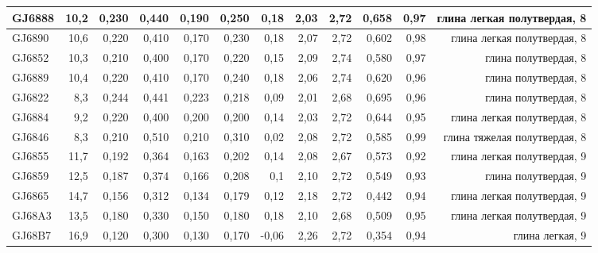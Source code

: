 \begin{landscape}
\begin{table}[h]
\begin{tabular}{@{}|l|r|r|r|r|r|r|r|r|r|r|r|@{}}
      GJ6888          & 10,2       & 0,230                        & 0,440   & 0,190  & 0,250  & 0,18     & 2,03     & 2,72      & 0,658   & 0,97     & глина легкая    полутвердая, 8   \\ \hline
      GJ6890          & 10,6       & 0,220                        & 0,410   & 0,170  & 0,230  & 0,18     & 2,07     & 2,72      & 0,602   & 0,98     & глина легкая    полутвердая, 8   \\ \hline
      GJ6852          & 10,3       & 0,210                        & 0,400   & 0,170  & 0,220  & 0,15     & 2,09     & 2,74      & 0,580   & 0,97     & глина полутвердая, 8   \\ \hline
      GJ6889          & 10,4       & 0,220                        & 0,410   & 0,170  & 0,240  & 0,18     & 2,06     & 2,74      & 0,620   & 0,96     & глина полутвердая, 8   \\ \hline
      GJ6822          & 8,3        & 0,244                        & 0,441   & 0,223  & 0,218  & 0,09     & 2,01     & 2,68      & 0,695   & 0,96     & глина полутвердая, 8   \\ \hline
      GJ6884          & 9,2        & 0,220                        & 0,400   & 0,200  & 0,200  & 0,14     & 2,03     & 2,72      & 0,644   & 0,95     & глина легкая    полутвердая, 8   \\ \hline
      GJ6846          & 8,3        & 0,210                        & 0,510   & 0,210  & 0,310  & 0,02     & 2,08     & 2,72      & 0,585   & 0,99     & глина тяжелая   полутвердая, 8   \\ \hline
      GJ6855          & 11,7       & 0,192                        & 0,364   & 0,163  & 0,202  & 0,14     & 2,08     & 2,67      & 0,573   & 0,92     & глина легкая    полутвердая, 9   \\ \hline
      GJ6859          & 12,5       & 0,187                        & 0,374   & 0,166  & 0,208  & 0,1      & 2,10     & 2,72      & 0,549   & 0,93     & глина полутвердая, 9   \\ \hline
      GJ6865          & 14,7       & 0,156                        & 0,312   & 0,134  & 0,179  & 0,12     & 2,18     & 2,72      & 0,442   & 0,94     & глина легкая    полутвердая, 9   \\ \hline
      GJ68A3          & 13,5       & 0,180                        & 0,330   & 0,150  & 0,180  & 0,18     & 2,10     & 2,68      & 0,509   & 0,95     & глина легкая    полутвердая, 9   \\ \hline
      GJ68B7          & 16,9       & 0,120                        & 0,300   & 0,130  & 0,170  & -0,06    & 2,26     & 2,72      & 0,354   & 0,94     & глина легкая, 9   \\ \hline

\end{tabular}
\end{table}
\end{landscape}
